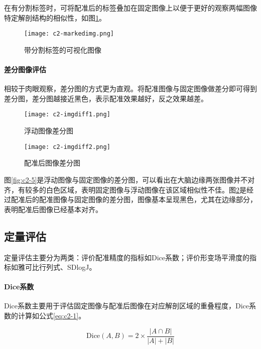 在有分割标签时，可将配准后的标签叠加在固定图像上以便于更好的观察两幅图像特定解剖结构的相似性，如图\ref{fig:c2-4}。

\begin{figure}[h]
    \centering
    \texttt{[image: c2-markedimg.png]}
    \caption{带分割标签的可视化图像}
    \label{fig:c2-4}
\end{figure}

\paragraph{差分图像评估}

相较于肉眼观察，差分图的方式更为直观。将配准图像与固定图像做差分即可得到差分图，差分图越接近黑色，表示配准效果越好，反之效果越差。

\begin{figure}[h]
    \centering
    \begin{minipage}{0.4\textwidth}
        \texttt{[image: c2-imgdiff1.png]}
        \caption{浮动图像差分图}
        \label{fig:c2-5}
    \end{minipage}
    \begin{minipage}{0.4\textwidth}
        \texttt{[image: c2-imgdiff2.png]}
        \caption{配准后图像差分图}
        \label{fig:c2-6}
    \end{minipage}
\end{figure}

图\ref{fig:c2-5}是浮动图像与固定图像的差分图，可以看出在大脑边缘两张图像并不对齐，有较多的白色区域，表明固定图像与浮动图像在该区域相似性不佳。图\ref{fig:c2-6}是经过配准后的配准图像与固定图像的差分图，图像基本呈现黑色，尤其在边缘部分，表明配准后图像已经基本对齐。

\subsection{定量评估}

定量评估主要分为两类：评价配准精度的指标如Dice系数；评价形变场平滑度的指标如雅可比行列式、SDlogJ。

\paragraph{Dice系数}

Dice系数主要用于评估固定图像与配准后图像在对应解剖区域的重叠程度，Dice系数的计算如公式\ref{eq:c2-1}。

\begin{equation}
    \mathrm{Dice}(A,B)=2\times\frac{\left|A\cap B\right|}{\left|A\right|+\left|B\right|}
    \label{eq:c2-1}
\end{equation}

